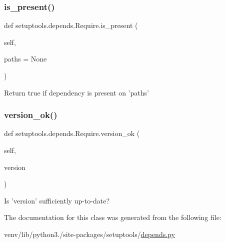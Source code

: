 \subsubsection{\texorpdfstring{is\+\_\+present()}{is\_present()}}
{\footnotesize\ttfamily def setuptools.\+depends.\+Require.\+is\+\_\+present (\begin{DoxyParamCaption}\item[{}]{self,  }\item[{}]{paths = {\ttfamily None} }\end{DoxyParamCaption})}

\begin{DoxyVerb}Return true if dependency is present on 'paths'\end{DoxyVerb}
 \mbox{\label{classsetuptools_1_1depends_1_1Require_ae09a6a0a9d85091433a92026a2540e27}} 
\subsubsection{\texorpdfstring{version\+\_\+ok()}{version\_ok()}}
{\footnotesize\ttfamily def setuptools.\+depends.\+Require.\+version\+\_\+ok (\begin{DoxyParamCaption}\item[{}]{self,  }\item[{}]{version }\end{DoxyParamCaption})}

\begin{DoxyVerb}Is 'version' sufficiently up-to-date?\end{DoxyVerb}
 

The documentation for this class was generated from the following file\+:\begin{DoxyCompactItemize}
\item 
venv/lib/python3./site-\/packages/setuptools/\hyperlink{depends_8py}{depends.\+py}\end{DoxyCompactItemize}
